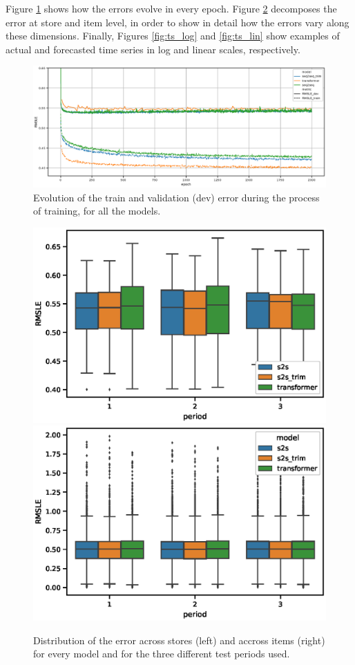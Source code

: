 Figure \ref{fig:performance_evolution} shows how the errors evolve in every epoch. Figure \ref{fig:stores_items_performance} decomposes the error at store and item level, in order to show in detail how the errors vary along these dimensions. Finally, Figures \ref{fig:ts_log} and \ref{fig:ts_lin} show examples of actual and forecasted time series in log and linear scales, respectively.

\begin{figure}[h!]
	\centering
	\includegraphics[width=1\linewidth]{salesforecast/images/evolution}
	\caption{Evolution of the train and validation (dev) error during the process of training, for all the models.}
	\label{fig:performance_evolution}
\end{figure}

 \begin{figure}[h!]
	\centering
	\includegraphics[width=0.48\linewidth]{salesforecast/images/rmsle_storewise}
	\includegraphics[width=0.48\linewidth]{salesforecast/images/rmsle_itemwise}
	\caption{Distribution of the error across stores (left) and accross items (right) for every model  and for the three different test periods used.}
	\label{fig:stores_items_performance}
\end{figure}

